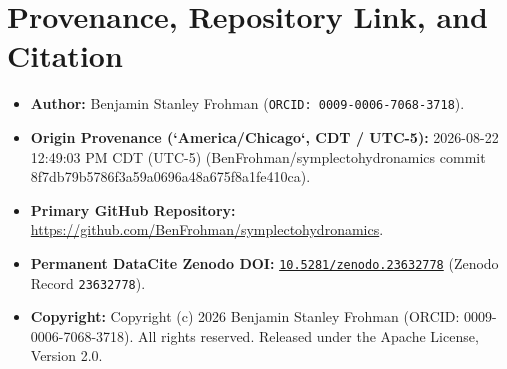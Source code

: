 \documentclass[11pt,letterpaper]{article}
\begin{document}
\section*{Provenance, Repository Link, and Citation}
\begin{itemize}[leftmargin=2em]
  \item \textbf{Author:} Benjamin Stanley Frohman (\texttt{ORCID: 0009-0006-7068-3718}).
  \item \textbf{Origin Provenance (`America/Chicago`, CDT / UTC-5):} 2026-08-22 12:49:03 PM CDT (UTC-5) (BenFrohman/symplectohydronamics commit 8f7db79b5786f3a59a0696a48a675f8a1fe410ca).
  \item \textbf{Primary GitHub Repository:} \url{https://github.com/BenFrohman/symplectohydronamics}.
  \item \textbf{Permanent DataCite Zenodo DOI:} \href{https://doi.org/10.5281/zenodo.23632778}{\texttt{10.5281/zenodo.23632778}} (Zenodo Record \texttt{23632778}).
  \item \textbf{Copyright:} Copyright (c) 2026 Benjamin Stanley Frohman (ORCID: 0009-0006-7068-3718). All rights reserved. Released under the Apache License, Version 2.0.
\end{itemize}
\end{document}
